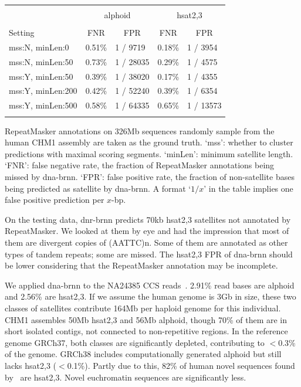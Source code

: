 \documentclass{bioinfo}
\begin{document}
\begin{table}[tb]
{\footnotesize
\begin{tabular}{p{3.3cm}rlrl}
\toprule\\[-1.5em]
& \multicolumn{2}{c}{\vspace{0.3em}alphoid} & \multicolumn{2}{c}{hsat2,3} \\
\cline{2-5}\\[-0.7em]
Setting & \multicolumn{1}{c}{FNR} & \multicolumn{1}{c}{FPR} & \multicolumn{1}{c}{FNR} & \multicolumn{1}{c}{FPR} \\[-0.5em]
\midrule
mss:N, minLen:0 & 0.51\% & 1 / 9719  & 0.18\% & 1 / 3954 \\
mss:N, minLen:50& 0.73\% & 1 / 28035 & 0.29\% & 1 / 4575 \\
mss:Y, minLen:50& 0.39\% & 1 / 38020 & 0.17\% & 1 / 4355 \\
mss:Y, minLen:200&0.42\% & 1 / 52240 & 0.39\% & 1 / 6354 \\
mss:Y, minLen:500&0.58\% & 1 / 64335 & 0.65\% & 1 / 13573 \\
\botrule
\end{tabular}
}{RepeatMasker annotations on 326Mb sequences randomly sample from the human
CHM1 assembly are taken as the ground truth. `mss': whether to cluster
predictions with maximal scoring segments.  `minLen': minimum satellite length.
`FNR': false negative rate, the fraction of RepeatMasker annotations being missed
by dna-brnn. `FPR': false positive rate, the fraction of non-satellite bases
being predicted as satellite by dna-brnn. A format `$1/x$' in the table implies
one false positive prediction per $x$-bp.}\label{tab:eval}
\end{table}

On the testing data, dnr-brnn predicts 70kb hsat2,3 satellites not annotated
by RepeatMasker. We looked at them by eye and had the impression that most of
them are divergent copies of (AATTC)n. Some of them are annotated as other
types of tandem repeats; some are missed. The hsat2,3 FPR of dna-brnn should be
lower considering that the RepeatMasker annotation may be incomplete.

We applied dna-brnn to the NA24385 CCS reads~\citep{Wenger519025}. 2.91\% read
bases are alphoid and 2.56\% are hsat2,3. If we assume the human genome is 3Gb
in size, these two classes of satellites contribute 164Mb per haploid genome
for this individual. CHM1 assembles 50Mb hsat2,3 and 56Mb alphoid, though 70\%
of them are in short isolated contigs, not connected to non-repetitive regions.
In the reference genome GRCh37, both classes are significantly depleted,
contributing to $<$0.3\% of the genome. GRCh38 includes computationally
generated alphoid but still lacks hsat2,3 ($<$0.1\%). Partly due to this,
82\% of human novel sequences found by~\citet{Sherman:2018aa} are hsat2,3.
Novel euchromatin sequences are significantly less.
\end{document}
